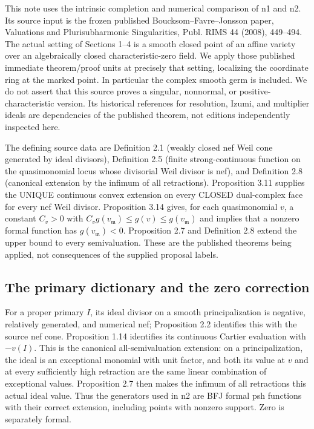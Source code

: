 \documentclass[11pt]{article}
\begin{document}
This note uses the intrinsic completion and numerical comparison of n1 and n2. Its source input is the frozen published Boucksom--Favre--Jonsson paper, Valuations and Plurisubharmonic Singularities, Publ. RIMS 44 (2008), 449--494. The actual setting of Sections 1--4 is a smooth closed point of an affine variety over an algebraically closed characteristic-zero field. We apply those published immediate theorem/proof units at precisely that setting, localizing the coordinate ring at the marked point. In particular the complex smooth germ is included. We do not assert that this source proves a singular, nonnormal, or positive-characteristic version. Its historical references for resolution, Izumi, and multiplier ideals are dependencies of the published theorem, not editions independently inspected here.

The defining source data are Definition 2.1 (weakly closed nef Weil cone generated by ideal divisors), Definition 2.5 (finite strong-continuous function on the quasimonomial locus whose divisorial Weil divisor is nef), and Definition 2.8 (canonical extension by the infimum of all retractions). Proposition 3.11 supplies the UNIQUE continuous convex extension on every CLOSED dual-complex face for every nef Weil divisor. Proposition 3.14 gives, for each quasimonomial $v$, a constant $C_v>0$ with $C_v g(v_{\mathfrak m})\le g(v)\le g(v_{\mathfrak m})$ and implies that a nonzero formal function has $g(v_{\mathfrak m})<0$. Proposition 2.7 and Definition 2.8 extend the upper bound to every semivaluation. These are the published theorems being applied, not consequences of the supplied proposal labels.

\subsection{The primary dictionary and the zero correction}

For a proper primary $I$, its ideal divisor on a smooth principalization is negative, relatively generated, and numerical nef; Proposition 2.2 identifies this with the source nef cone. Proposition 1.14 identifies its continuous Cartier evaluation with $-v(I)$. This is the canonical all-semivaluation extension: on a principalization, the ideal is an exceptional monomial with unit factor, and both its value at $v$ and at every sufficiently high retraction are the same linear combination of exceptional values. Proposition 2.7 then makes the infimum of all retractions this actual ideal value. Thus the generators used in n2 are BFJ formal psh functions with their correct extension, including points with nonzero support. Zero is separately formal.
\end{document}
